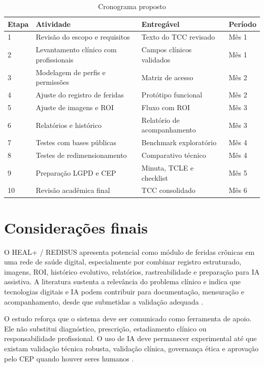 \documentclass[
    12pt,
    oneside,
    a4paper,
    chapter=TITLE,
    brazil,
    sumario=tradicional,
    hidelinks
]{abntex2}
\begin{document}
\begin{table}[htbp]
    \centering
    \caption{\label{tab:cronograma}Cronograma proposto}
    \begin{tabular}{L{1.3cm}L{5.1cm}L{5.1cm}L{1.6cm}}
        \toprule
        \textbf{Etapa} & \textbf{Atividade} & \textbf{Entregável} & \textbf{Período} \\
         & Revisão do escopo e requisitos & Texto do TCC revisado & Mês 1 \\
        2 & Levantamento clínico com profissionais & Campos clínicos validados & Mês 1 \\
        3 & Modelagem de perfis e permissões & Matriz de acesso & Mês 2 \\
        4 & Ajuste do registro de feridas & Protótipo funcional & Mês 2 \\
        5 & Ajuste de imagens e ROI & Fluxo com ROI & Mês 3 \\
        6 & Relatórios e histórico & Relatório de acompanhamento & Mês 3 \\
        7 & Testes com bases públicas & Benchmark exploratório & Mês 4 \\
        8 & Testes de redimensionamento & Comparativo técnico & Mês 4 \\
        9 & Preparação LGPD e CEP & Minuta, TCLE e checklist & Mês 5 \\
        10 & Revisão acadêmica final & TCC consolidado & Mês 6 \\
        \bottomrule
    \end{tabular}
\end{table}

\chapter{Considerações finais}

O HEAL+ / REDISUS apresenta potencial como módulo de feridas crônicas em uma rede de saúde digital, especialmente por combinar registro estruturado, imagens, ROI, histórico evolutivo, relatórios, rastreabilidade e preparação para IA assistiva. A literatura sustenta a relevância do problema clínico e indica que tecnologias digitais e IA podem contribuir para documentação, mensuração e acompanhamento, desde que submetidas a validação adequada \cite{olsson2019,sen2019,anisuzzaman2022,dabas2023}.

O estudo reforça que o sistema deve ser comunicado como ferramenta de apoio. Ele não substitui diagnóstico, prescrição, estadiamento clínico ou responsabilidade profissional. O uso de IA deve permanecer experimental até que existam validação técnica robusta, validação clínica, governança ética e aprovação pelo CEP quando houver seres humanos \cite{who2021,who2023,brasil2012}.
\end{document}
